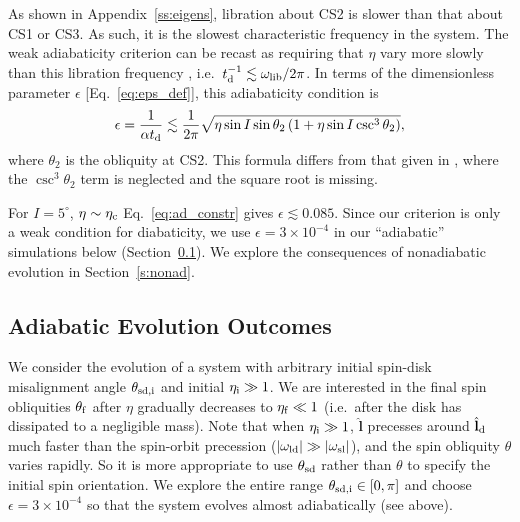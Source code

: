 \documentclass[
        fleqn,
        usenatbib,
    ]{mnras}
\newcommand*{\abs}[1]{\left|#1\right|}
\newcommand*{\bm}[1]{\boldsymbol{\mathbf{#1}}}
\newcommand*{\uv}[1]{\hat{\bm{#1}}}
\newcommand*{\p}[1]{\left(#1\right)}
\begin{document}
As shown in Appendix~\ref{ss:eigens}, libration about CS2 is slower than that
about CS1 or CS3. As such, it is the slowest characteristic frequency in the
system. The weak adiabaticity criterion can be recast as requiring that $\eta$
vary more slowly than this libration frequency
\citep[see][]{ward2004II,millholland_disk}, i.e.\ $t_{\rm d}^{-1} \lesssim
\omega_{\rm lib} / 2\pi$. In terms of the dimensionless parameter $\epsilon$
[Eq.~\eqref{eq:eps_def}], this adiabaticity condition is
\begin{equation}
    \epsilon = \frac{1}{\alpha t_{\rm d}}
        \lesssim \frac{1}{2\pi}\sqrt{\eta\sin I \sin \theta_2
            \p{1 + \eta \sin I \csc^3 \theta_2}},
            \label{eq:ad_constr}
\end{equation}
where $\theta_2$ is the obliquity at CS2. This formula differs from that given
in \citet{millholland_disk}, where the $\csc^3\theta_2$ term is neglected and
the square root is missing.

For $I = 5^\circ$, $\eta \sim \eta_{\rm c}$ Eq.~\eqref{eq:ad_constr} gives $\epsilon
\lesssim 0.085$. Since our criterion is only a weak condition for diabaticity,
we use $\epsilon = 3 \times 10^{-4}$ in our ``adiabatic'' simulations below
(Section~\ref{ss:ad_ensemble}). We explore the consequences of nonadiabatic
evolution in Section~\ref{s:nonad}.

\subsection{Adiabatic Evolution Outcomes}\label{ss:ad_ensemble}

We consider the evolution of a system with arbitrary initial spin-disk
misalignment angle $\theta_{\rm sd, i}$ and initial $\eta_{\rm i} \gg 1$. We are
interested in the final spin obliquities $\theta_{\rm f}$ after $\eta$ gradually
decreases to $\eta_{\rm f} \ll 1$ (i.e.\ after the disk has dissipated to a
negligible mass). Note that when $\eta_{\rm i} \gg 1$, $\uv{l}$ precesses
around $\uv{l}_{\rm d}$ much faster than the spin-orbit precession
($\abs{\omega_{\rm ld}} \gg \abs{\omega_{\rm sl}}$), and the spin obliquity
$\theta$ varies rapidly. So it is more appropriate to use $\theta_{\rm sd}$
rather than $\theta$ to specify the initial spin orientation. We explore the
entire range $\theta_{\rm sd, i} \in [0, \pi]$ and choose $\epsilon = 3 \times
10^{-4}$ so that the system evolves almost adiabatically (see above).
\end{document}
